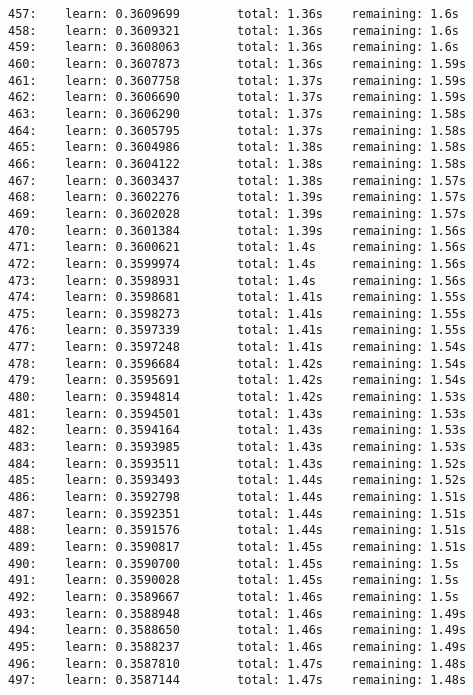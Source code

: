 \documentclass[11pt]{article}
\begin{document}
\begin{Verbatim}[commandchars=\\\{\}]
457:    learn: 0.3609699        total: 1.36s    remaining: 1.6s
458:    learn: 0.3609321        total: 1.36s    remaining: 1.6s
459:    learn: 0.3608063        total: 1.36s    remaining: 1.6s
460:    learn: 0.3607873        total: 1.36s    remaining: 1.59s
461:    learn: 0.3607758        total: 1.37s    remaining: 1.59s
462:    learn: 0.3606690        total: 1.37s    remaining: 1.59s
463:    learn: 0.3606290        total: 1.37s    remaining: 1.58s
464:    learn: 0.3605795        total: 1.37s    remaining: 1.58s
465:    learn: 0.3604986        total: 1.38s    remaining: 1.58s
466:    learn: 0.3604122        total: 1.38s    remaining: 1.58s
467:    learn: 0.3603437        total: 1.38s    remaining: 1.57s
468:    learn: 0.3602276        total: 1.39s    remaining: 1.57s
469:    learn: 0.3602028        total: 1.39s    remaining: 1.57s
470:    learn: 0.3601384        total: 1.39s    remaining: 1.56s
471:    learn: 0.3600621        total: 1.4s     remaining: 1.56s
472:    learn: 0.3599974        total: 1.4s     remaining: 1.56s
473:    learn: 0.3598931        total: 1.4s     remaining: 1.56s
474:    learn: 0.3598681        total: 1.41s    remaining: 1.55s
475:    learn: 0.3598273        total: 1.41s    remaining: 1.55s
476:    learn: 0.3597339        total: 1.41s    remaining: 1.55s
477:    learn: 0.3597248        total: 1.41s    remaining: 1.54s
478:    learn: 0.3596684        total: 1.42s    remaining: 1.54s
479:    learn: 0.3595691        total: 1.42s    remaining: 1.54s
480:    learn: 0.3594814        total: 1.42s    remaining: 1.53s
481:    learn: 0.3594501        total: 1.43s    remaining: 1.53s
482:    learn: 0.3594164        total: 1.43s    remaining: 1.53s
483:    learn: 0.3593985        total: 1.43s    remaining: 1.53s
484:    learn: 0.3593511        total: 1.43s    remaining: 1.52s
485:    learn: 0.3593493        total: 1.44s    remaining: 1.52s
486:    learn: 0.3592798        total: 1.44s    remaining: 1.51s
487:    learn: 0.3592351        total: 1.44s    remaining: 1.51s
488:    learn: 0.3591576        total: 1.44s    remaining: 1.51s
489:    learn: 0.3590817        total: 1.45s    remaining: 1.51s
490:    learn: 0.3590700        total: 1.45s    remaining: 1.5s
491:    learn: 0.3590028        total: 1.45s    remaining: 1.5s
492:    learn: 0.3589667        total: 1.46s    remaining: 1.5s
493:    learn: 0.3588948        total: 1.46s    remaining: 1.49s
494:    learn: 0.3588650        total: 1.46s    remaining: 1.49s
495:    learn: 0.3588237        total: 1.46s    remaining: 1.49s
496:    learn: 0.3587810        total: 1.47s    remaining: 1.48s
497:    learn: 0.3587144        total: 1.47s    remaining: 1.48s

\end{Verbatim}
\end{document}
